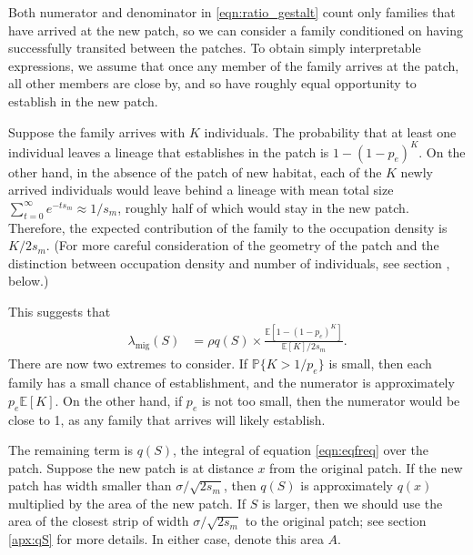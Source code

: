 \documentclass{article}
\renewcommand{\P}{\mathbb{P}}
\newcommand{\E}{\mathbb{E}}
\newcommand{\migrate}{\lambda_\text{mig}}
\newcommand{\secref}[1]{{\emph{\nameref{#1}}}}
\begin{document}
Both numerator and denominator in \eqref{eqn:ratio_gestalt} 
count only families that have arrived at the new patch,
so we can consider a family conditioned on having successfully transited between the patches.
To obtain simply interpretable expressions,
we assume that once any member of the family arrives at the patch,
all other members are close by, and so have roughly equal opportunity
to establish in the new patch.

Suppose the family arrives with $K$ individuals.
The probability that at least one individual leaves a lineage that establishes in the patch
is $1-(1-p_e)^K$.
On the other hand, in the absence of the patch of new habitat,
each of the $K$ newly arrived individuals would leave behind a lineage with 
mean total size $\sum_{t=0}^\infty e^{-t s_m} \approx 1/s_m$,
roughly half of which would stay in the new patch.
Therefore, the expected contribution of the family to the occupation density is $K/2s_m$.
(For more careful consideration of the geometry of the patch
and the distinction between occupation density and number of individuals,
see section \secref{ss:hitting_occupation}, below.)

This suggests that 
\begin{align} \label{eqn:ratio_K}
  \migrate(S) 
    &= \rho q(S) \times 
    \frac{
        \E[1-(1-p_e)^K]
    }{
        \E[K]/2s_m
    } .
\end{align}
There are now two extremes to consider.
If $\P\{K>1/p_e\}$ is small, then each family has a small chance of establishment,
and the numerator is approximately $p_e \E[K]$.
On the other hand, if $p_e$ is not too small,
then the numerator would be close to 1, as any family that arrives will likely establish.

The remaining term is $q(S)$, the integral of equation \eqref{eqn:eqfreq} over the patch.
Suppose the new patch is at distance $x$ from the original patch.
If the new patch has width smaller than $\sigma/\sqrt{2s_m}$, 
then $q(S)$ is approximately $q(x)$ multiplied by the area of the new patch.
If $S$ is larger, then we should use the area of the closest strip
of width $\sigma/\sqrt{2s_m}$ to the original patch;
see section \ref{apx:qS} for more details.
In either case, denote this area $A$.
\end{document}
